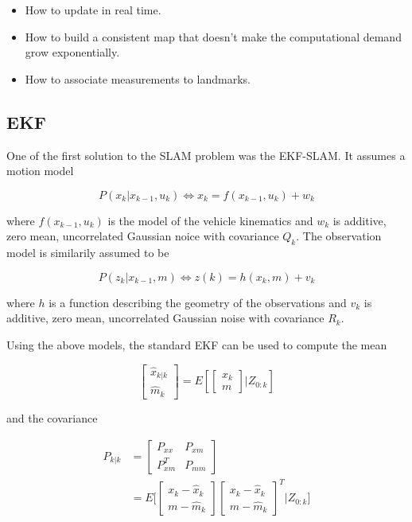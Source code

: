 \begin{itemize}
    \item How to update in real time.
    \item How to build a consistent map that doesn't make the computational demand grow exponentially.
    \item How to associate measurements to landmarks.
\end{itemize}

\subsection{EKF}

One of the first solution to the SLAM problem was the EKF-SLAM\cite{EKFSLAM}. It assumes a motion model 

\begin{equation}
    P(x_k|x_{k-1},u_k) \iff  x_k = f(x_{k-1},u_k) + w_k
\end{equation}

where $f(x_{k-1},u_k)$ is the model of the vehicle kinematics and $w_k$ is additive, zero mean, uncorrelated Gaussian noice with covariance $Q_k$. The observation model is similarily assumed to be 

\begin{equation}
    P(z_k|x_{k-1},m) \iff  z(k) = h(x_{k},m) + v_k
\end{equation}

where $h$ is a function describing the geometry of the observations and $v_k$ is additive, zero mean, uncorrelated Gaussian noise with covariance $R_k$. 

Using the above models, the standard EKF can be used to compute the mean 

\begin{equation}
    \begin{bmatrix} \hat{x}_{k|k} \\ \hat{m}_k \end{bmatrix} = E[\begin{bmatrix} x_k \\ m \end{bmatrix} | Z_{0:k}]
\end{equation}

and the covariance

\begin{align}
    P_{k|k} &= \begin{bmatrix} P_{xx} & P_{xm} \\ P^T_{xm} & P_{mm} \end{bmatrix} \\
     &= E\bigg[\begin{bmatrix} x_k-\hat{x}_k \\ m - \hat{m}_k\end{bmatrix}\begin{bmatrix} x_k-\hat{x}_k \\ m - \hat{m}_k\end{bmatrix}^T \bigg| Z_{0:k} \bigg]
\end{align}

